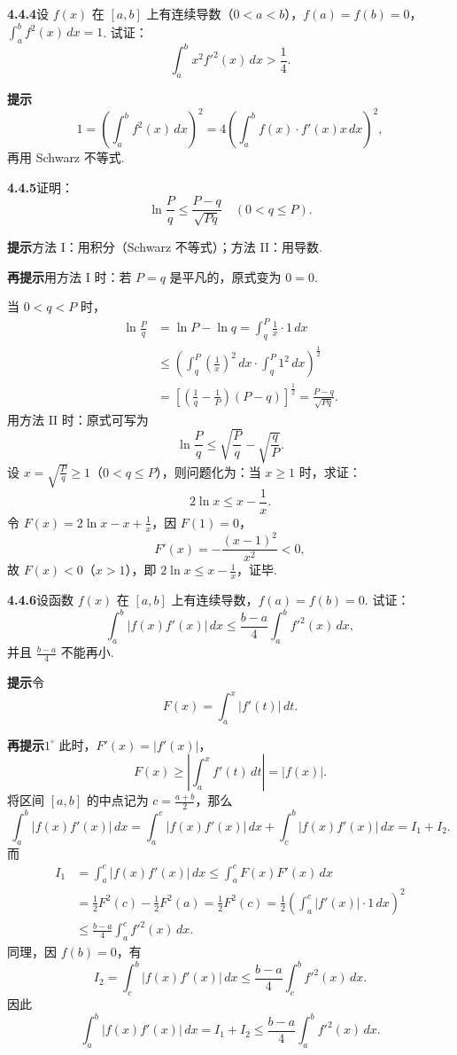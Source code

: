 \documentclass[UTF8, 12pt, fontset=fandol, oneside]{ctexart}
\begin{document}
\noindent\textbf{4.4.4}\quad 设 $f(x)$ 在 $[a,b]$ 上有连续导数（$0<a<b$），$f(a)=f(b)=0$，$\int_a^b f^2(x)\,dx=1$. 试证：
\[
\int_a^b x^2f'^2(x)\,dx>\frac14.
\]

\noindent\textbf{提示}\quad
\[
1=\left(\int_a^b f^2(x)\,dx\right)^2
=4\left(\int_a^b f(x)\cdot f'(x)x\,dx\right)^2,
\]
再用 Schwarz 不等式.

\noindent\textbf{4.4.5}\quad 证明：
\[
\ln\frac Pq\le\frac{P-q}{\sqrt{Pq}}\quad(0<q\le P).
\]

\noindent\textbf{提示}\quad 方法 I：用积分（Schwarz 不等式）；方法 II：用导数.

\noindent\textbf{再提示}\quad 用方法 I 时：若 $P=q$ 是平凡的，原式变为 $0=0$.

当 $0<q<P$ 时，
\[
\begin{aligned}
\ln\frac Pq&=\ln P-\ln q=\int_q^P\frac1x\cdot1\,dx\\
&\le\left(\int_q^P\left(\frac1x\right)^2\,dx\cdot\int_q^P1^2\,dx\right)^{\frac12}\\
&=\left[\left(\frac1q-\frac1P\right)(P-q)\right]^{\frac12}
=\frac{P-q}{\sqrt{Pq}}.
\end{aligned}
\]
用方法 II 时：原式可写为
\[
\ln\frac Pq\le\sqrt{\frac Pq}-\sqrt{\frac qP}.
\]
设 $x=\sqrt{\frac Pq}\ge1$（$0<q\le P$），则问题化为：当 $x\ge1$ 时，求证：
\[
2\ln x\le x-\frac1x.
\]
令 $F(x)=2\ln x-x+\frac1x$，因 $F(1)=0$，
\[
F'(x)=-\frac{(x-1)^2}{x^2}<0,
\]
故 $F(x)<0$（$x>1$），即 $2\ln x\le x-\frac1x$，证毕.

\noindent\textbf{4.4.6}\quad 设函数 $f(x)$ 在 $[a,b]$ 上有连续导数，$f(a)=f(b)=0$. 试证：
\[
\int_a^b |f(x)f'(x)|\,dx\le\frac{b-a}{4}\int_a^b f'^2(x)\,dx,
\]
并且 $\frac{b-a}{4}$ 不能再小.

\noindent\textbf{提示}\quad 令
\[
F(x)=\int_a^x |f'(t)|\,dt.
\]

\noindent\textbf{再提示}\quad $1^\circ$ 此时，$F'(x)=|f'(x)|$，
\[
F(x)\ge\left|\int_a^x f'(t)\,dt\right|=|f(x)|.
\]
将区间 $[a,b]$ 的中点记为 $c=\frac{a+b}{2}$，那么
\[
\int_a^b |f(x)f'(x)|\,dx
=\int_a^c |f(x)f'(x)|\,dx+\int_c^b |f(x)f'(x)|\,dx=I_1+I_2.
\]
而
\begin{equation}
\begin{aligned}
I_1&=\int_a^c |f(x)f'(x)|\,dx
\le\int_a^c F(x)F'(x)\,dx\\
&=\frac12F^2(c)-\frac12F^2(a)
=\frac12F^2(c)
=\frac12\left(\int_a^c |f'(x)|\cdot1\,dx\right)^2\\
&\le\frac{b-a}{4}\int_a^c f'^2(x)\,dx.
\end{aligned}
\tag{1}
\end{equation}
同理，因 $f(b)=0$，有
\[
I_2=\int_c^b |f(x)f'(x)|\,dx
\le\frac{b-a}{4}\int_c^b f'^2(x)\,dx. \tag{2}
\]
因此
\[
\int_a^b |f(x)f'(x)|\,dx=I_1+I_2
\le\frac{b-a}{4}\int_a^b f'^2(x)\,dx.
\]
\end{document}
